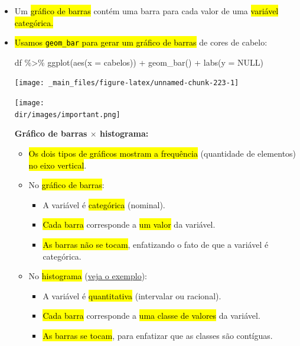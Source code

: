 \documentclass[
  11pt]{report}
\newenvironment{Shaded}{\begin{snugshade}}{\end{snugshade}}
\newcommand{\AttributeTok}[1]{\textcolor[rgb]{0.77,0.63,0.00}{#1}}
\newcommand{\ConstantTok}[1]{\textcolor[rgb]{0.00,0.00,0.00}{#1}}
\newcommand{\FunctionTok}[1]{\textcolor[rgb]{0.00,0.00,0.00}{#1}}
\newcommand{\NormalTok}[1]{#1}
\newcommand{\SpecialCharTok}[1]{\textcolor[rgb]{0.00,0.00,0.00}{#1}}
\newcommand{\dir}{/ssd/R/x86_64-pc-linux-gnu-library/4.3/fnaufelRmd/rmarkdown/resources}
\newenvironment{rmdimportant}
{
  \begin{myimportant}
    \texttt{[image: \\dir/images/important.png]}
    \tcblower
  }
  {
  \end{myimportant}
}
\renewenvironment{Shaded}{
    \begin{mdframed}[%
      roundcorner=2pt,%
      innerleftmargin=5pt,%
      innerrightmargin=5pt,%
      topline=true,%
      leftline=true,%
      rightline=true,%
      bottomline=true,%
      linewidth=0.5pt,%
      linecolor=black!20,%
      backgroundcolor=black!2,%
      skipabove=2ex,%
      skipbelow=2.5ex%
    ]%
  }
  {
    \end{mdframed}
  }
\begin{document}
\begin{itemize}
\item
  Um {\hl{gráfico de barras}} contém uma barra para cada valor de uma {\hl{variável categórica.}}
\item
  {\hl{Usamos {\mbox{\texttt{geom\_bar}}} para gerar um gráfico de barras}} de cores de cabelo:

\begin{Shaded}
\begin{Highlighting}[]
\NormalTok{df }\SpecialCharTok{\%\textgreater{}\%} 
  \FunctionTok{ggplot}\NormalTok{(}\FunctionTok{aes}\NormalTok{(}\AttributeTok{x =}\NormalTok{ cabelos)) }\SpecialCharTok{+}
    \FunctionTok{geom\_bar}\NormalTok{() }\SpecialCharTok{+}
    \FunctionTok{labs}\NormalTok{(}\AttributeTok{y =} \ConstantTok{NULL}\NormalTok{)}
\end{Highlighting}
\end{Shaded}

  \begin{center}\texttt{[image: \_main\_files/figure-latex/unnamed-chunk-223-1]} \end{center}

  \begin{rmdimportant}

  \textbf{Gráfico de barras $\times$ histograma:}

  \begin{itemize}
  \item
    {\hl{Os dois tipos de gráficos mostram a frequência}} (quantidade de elementos) {\hl{no eixo vertical}}.
  \item
    No {\hl{gráfico de barras}}:

    \begin{itemize}
    \item
      A variável é {\hl{categórica}} (nominal).
    \item
      {\hl{Cada barra}} corresponde a {\hl{um valor}} da variável.
    \item
      {\hl{As barras não se tocam}}, enfatizando o fato de que a variável é categórica.
    \end{itemize}
  \item
    No {\hl{histograma}} (\protect\hyperlink{histograma1}{veja o exemplo}):

    \begin{itemize}
    \item
      A variável é {\hl{quantitativa}} (intervalar ou racional).
    \item
      {\hl{Cada barra}} corresponde a {\hl{uma classe de valores}} da variável.
    \item
      {\hl{As barras se tocam}}, para enfatizar que as classes são contíguas.
    \end{itemize}
  \end{itemize}


\end{rmdimportant}
\end{itemize}
\end{document}
